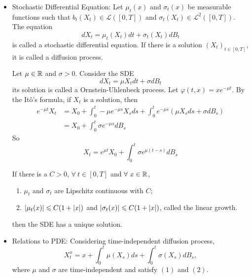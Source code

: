 \documentclass[a4paper,12pt]{article}
\begin{document}
\begin{itemize}
  \item Stochastic Differential Equation: Let $\mu_t(x)$ and $\sigma_t(x)$ be measurable functions such that $b_t(X_t) \in \mathcal{L}([0,T])$ and $\sigma_t(X_t) \in \mathcal{L}^2([0,T])$. The equation 
  \begin{equation*}
    dX_t = \mu_t(X_t)dt + \sigma_t(X_t)dB_t
  \end{equation*}
  is called a stochastic differential equation. If there is a solution $(X_t)_{t \in [0,T]}$, it is called a diffusion process.
  \begin{exam}
    Let $\mu \in \mathbb{R}$ and $\sigma > 0$. Consider the SDE
    \begin{equation*}
      dX_t = \mu X_t dt + \sigma dB_t
    \end{equation*}
    its solution is called a Ornstein-Uhlenbeck process. Let $\varphi(t,x) = xe^{-\mu t}$. By the It\^o's formula, if $X_t$ is a solution, then
    \begin{equation*}
      \begin{split}
        e^{-\mu t}X_t &= X_0 + \int_0^t-\mu e^{-\mu s}X_s ds + \int_0^t e^{-\mu s} ( \mu X_s ds + \sigma dB_s) \\
        &= X_0 + \int_0^t \sigma e^{-\mu s}dB_s
      \end{split}
    \end{equation*}
    So
    \begin{equation*}
      X_t = e^{\mu t}X_0 + \int_0^t \sigma e^{\mu (t - s)}dB_s
    \end{equation*}
  \end{exam}

  \begin{thm}
    If there is a $C>0$, $\forall~t\in [0,T]$ and $\forall~x \in \mathbb{R}$,
    \begin{enumerate}[label=(\arabic*)]
      \item $\mu_t$ and $\sigma_t$ are Lipschitz continuous with $C$;
      \item $\left\lvert\mu_t(x)\right\lvert \leqslant C(1+\left\lvert x\right\lvert)$ and $\left\lvert\sigma_t(x)\right\lvert \leqslant C(1+\left\lvert x\right\lvert)$, called the linear growth.
    \end{enumerate}
    then the SDE has a unique solution.
  \end{thm}

  \item Relations to PDE: Considering time-independent diffusion process,
  \begin{equation*}
    X_t^x = x + \int_0^t\mu(X_s)ds + \int_0^t\sigma(X_s)dB_s,
  \end{equation*}
  where $\mu$ and $\sigma$ are time-independent and satisfy $(1)$ and $(2)$.


\end{itemize}
\end{document}
